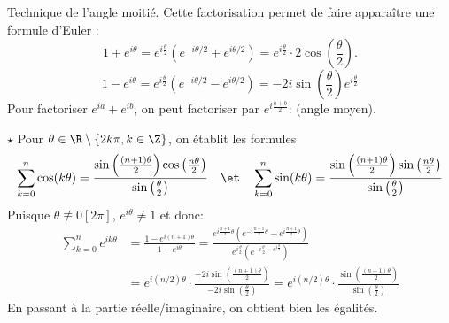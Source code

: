 \documentclass[11pt]{article}
\begin{document}
\begin{meth}{Technique de l'angle moitié.}{}
    Cette factorisation permet de faire apparaître une formule d'Euler :
    \begin{equation*}
        1+e^{i\theta}=e^{i\frac{\theta}{2}}\left( e^{-i\theta/2}+e^{i\theta/2} \right)=e^{i\frac{\theta}{2}}\cdot 2\cos\left( \frac{\theta}{2} \right).
    \end{equation*}
    \begin{equation*}
        1-e^{i\theta}=e^{i\frac{\theta}{2}}\left( e^{-i\theta/2} - e^{i\theta/2} \right)=-2i\sin\left( \frac{\theta}{2} \right)e^{i\frac{\theta}{2}}
    \end{equation*}
    Pour factoriser $e^{ia}+e^{ib}$, on peut factoriser par $e^{i\frac{a+b}{2}}$: (angle moyen).
\end{meth}

\begin{ex}{$\star$}{}
    Pour $\theta\in\R\setminus\{2k\pi, k\in\Z\}$, on établit les formules
    \begin{equation*}
        \sum_{k=0}^n\cos(k\theta)=\frac{\sin\left( \frac{(n+1)\theta}{2} \right)\cos\left( \frac{n\theta}{2} \right)}{\sin\left( \frac{\theta}{2} \right)}\quad\et\quad\sum_{k=0}^n\sin(k\theta)=\frac{\sin\left( \frac{(n+1)\theta}{2} \right)\sin\left( \frac{n\theta}{2} \right)}{\sin\left( \frac{\theta}{2} \right)}
    \end{equation*}
    \tcblower
    Puisque $\theta\not\equiv0[2\pi]$, $e^{i\theta}\neq1$ et donc:
    \begin{align*}
        \sum_{k=0}^ne^{ik\theta}&=\frac{1-e^{i(n+1)\theta}}{1-e^{i\theta}}=\frac{e^{i\frac{n+1}{2}\theta}\left( e^{-i\frac{n+1}{2}\theta}-e^{i\frac{n+1}{2}\theta} \right)}{e^{i\frac{\theta}{2}}\left( e^{-i\frac{\theta}{2}-e^{i\frac{\theta}{2}}} \right)}\\
        &=e^{i(n/2)\theta}\cdot\frac{-2i\sin\left( \frac{(n+1)\theta}{2} \right)}{-2i\sin\left( \frac{\theta}{2} \right)}=e^{i(n/2)\theta}\cdot\frac{\sin\left( \frac{(n+1)\theta}{2} \right)}{\sin\left( \frac{\theta}{2} \right)}
    \end{align*}
    En passant à la partie réelle/imaginaire, on obtient bien les égalités.
\end{ex}
\end{document}
